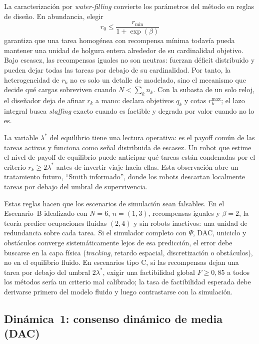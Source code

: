 La caracterización por \emph{water-filling} convierte los parámetros del método en
reglas de diseño. En abundancia, elegir
\begin{equation}
  r_0 \leq \frac{r_{\min}}{1+\exp(\beta)}
  \label{eq:idle_slack_rule}
\end{equation}
garantiza que una tarea homogénea con recompensa mínima todavía pueda mantener una
unidad de holgura entera alrededor de su cardinalidad objetivo. Bajo escasez, las
recompensas iguales no son neutras: fuerzan déficit distribuido y pueden dejar todas las
tareas por debajo de su cardinalidad. Por tanto, la heterogeneidad de $r_k$ no es solo un
detalle de modelado, sino el mecanismo que decide qué cargas sobreviven cuando
$N<\sum_k n_k$. Con la subasta de un solo reloj, el diseñador deja de afinar $r_k$ a mano:
declara objetivos $q_k$ y cotas $r_k^{\max}$; el lazo integral busca \emph{staffing}
exacto cuando es factible y degrada por valor cuando no lo es.

La variable $\lambda^*$ del equilibrio tiene una lectura operativa: es el payoff común
de las tareas activas y funciona como señal distribuida de escasez. Un robot que estime
el nivel de payoff de equilibrio puede anticipar qué tareas están condenadas por el
criterio $r_k\ge 2\lambda^*$ antes de invertir viaje hacia ellas. Esta observación abre
un tratamiento futuro, ``Smith informado'', donde los robots descartan localmente tareas
por debajo del umbral de supervivencia.

Estas reglas hacen que los escenarios de simulación sean falsables. En el Escenario~B
idealizado con $N=6$, $n=(1,3)$, recompensas iguales y $\beta=2$, la teoría predice
ocupaciones fluidas $(2,4)$ y sin robots inactivos: una unidad de redundancia sobre cada
tarea. Si el simulador completo con $\Psi$, DAC, uniciclo y obstáculos converge
sistemáticamente lejos de esa predicción, el error debe buscarse en la capa física
(\emph{tracking}, retardo espacial, discretización o obstáculos), no en el equilibrio
fluido. En escenarios tipo C, si las recompensas dejan una tarea por debajo del umbral
$2\lambda^*$, exigir una factibilidad global $F\ge0{,}85$ a todos los métodos sería un
criterio mal calibrado; la tasa de factibilidad esperada debe derivarse primero del
modelo fluido y luego contrastarse con la simulación.



\subsection{Dinámica~1: consenso dinámico de media (DAC)}

